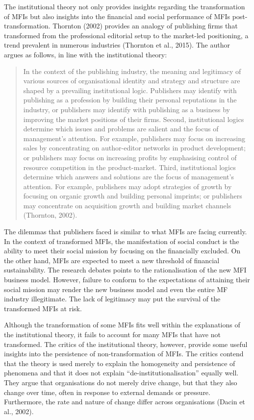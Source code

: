 \documentclass[a4paper, nobind]{templates/ociamthesis}
\begin{document}
The institutional theory not only provides insights regarding the transformation of MFIs but also insights into the financial and social performance of MFIs post-transformation. Thornton (2002) provides an analogy of publishing firms that transformed from the professional editorial setup to the market-led positioning, a trend prevalent in numerous industries (Thornton et al., 2015). The author argues as follows, in line with the institutional theory:

\begin{quote}
In the context of the publishing industry, the meaning and legitimacy of various sources of organisational identity and strategy and structure are shaped by a prevailing institutional logic. Publishers may identify with publishing as a profession by building their personal reputations in the industry, or publishers may identify with publishing as a business by improving the market positions of their firms. Second, institutional logics determine which issues and problems are salient and the focus of management's attention. For example, publishers may focus on increasing sales by concentrating on author-editor networks in product development; or publishers may focus on increasing profits by emphasising control of resource competition in the product-market. Third, institutional logics determine which answers and solutions are the focus of management's attention. For example, publishers may adopt strategies of growth by focusing on organic growth and building personal imprints; or publishers may concentrate on acquisition growth and building market channels (Thornton, 2002).
\end{quote}

The dilemmas that publishers faced is similar to what MFIs are facing currently. In the context of transformed MFIs, the manifestation of social conduct is the ability to meet their social mission by focusing on the financially excluded. On the other hand, MFIs are expected to meet a new threshold of financial sustainability. The research debates points to the rationalisation of the new MFI business model. However, failure to conform to the expectations of attaining their social mission may render the new business model and even the entire MF industry illegitimate. The lack of legitimacy may put the survival of the transformed MFIs at risk.

Although the transformation of some MFIs fits well within the explanations of the institutional theory, it fails to account for many MFIs that have not transformed. The critics of the institutional theory, however, provide some useful insights into the persistence of non-transformation of MFIs. The critics contend that the theory is used merely to explain the homogeneity and persistence of phenomena and that it does not explain ``de-institutionalisation'' equally well. They argue that organisations do not merely drive change, but that they also change over time, often in response to external demands or pressure. Furthermore, the rate and nature of change differ across organisations (Dacin et al., 2002).
\end{document}
